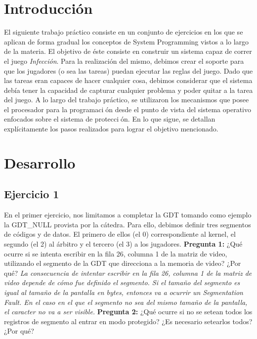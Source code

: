 \documentclass[10pt, a4paper]{article}
\begin{document}
\section{Introducci\'on}
El siguiente trabajo práctico consiste en un conjunto de ejercicios en los que se aplican de forma gradual los conceptos de System Programming vistos a lo largo de la materia. El objetivo de éste consiste en construir un sistema capaz de correr el juego \textit{Infección}. Para la realización del mismo, debimos crear el soporte para que los jugadores (o sea las tareas) puedan ejecutar las reglas del juego. Dado que las tareas eran capaces de hacer cualquier cosa, debimos considerar que el sistema debía tener la capacidad de capturar cualquier problema y poder quitar a la tarea del juego.\newline
A lo largo del trabajo práctico, se utilizaron los mecanismos que posee el procesador para la programación desde el punto de vista del sistema operativo enfocados sobre el sistema de protección. En lo que sigue, se detallan explícitamente los pasos realizados para lograr el objetivo mencionado.

\section{Desarrollo}

\subsection{Ejercicio 1}

En el primer ejercicio, nos limitamos a completar la GDT tomando como ejemplo la GDT_NULL provista por la cátedra. Para ello, debimos definir tres segmentos de códigos y de datos. El primero de ellos (el 0) correspondiente al kernel, el segundo (el 2) al árbitro y el tercero (el 3) a los jugadores.\newline
{\textbf{Pregunta 1:}} ¿Qué ocurre si se intenta escribir en la fila 26, columna 1 de la matriz de video, utilizando el segmento de la GDT que direcciona a la memoria de video? ¿Por qué?\newline
\newline
\textit{La consecuencia de intentar escribir en la fila 26, columna 1 de la matriz de video depende de cómo fue definido el segmento. Si el tamaño del segmento es igual al tamaño de la pantalla en bytes, entonces va a ocurrir un Segmentation Fault. En el caso en el que el segmento no sea del mismo tamaño de la pantalla, el caracter no va a ser visible.}\newline
\newline
{\textbf{Pregunta 2:}} ¿Qué ocurre si no se setean todos los registros de segmento al entrar en modo protegido? ¿Es necesario setearlos todos? ¿Por qué?\newline
\end{document}
